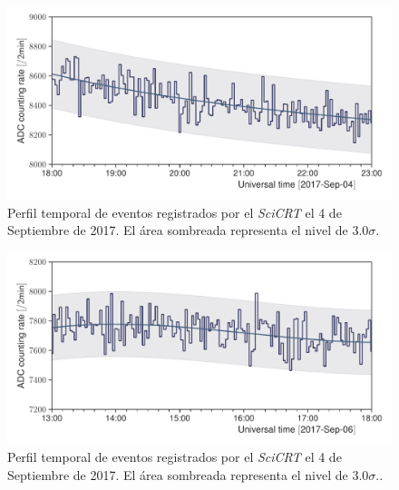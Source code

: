 \begin{figure}
        \centering
        \includegraphics[width=\textwidth]{neutron-170904.pdf}
        \caption{Perfil temporal de eventos registrados por el \emph{SciCRT} el \num{4} de Septiembre de \num{2017}. El área sombreada representa el nivel de $3.0\sigma$.}
        \label{fig:september-04}
\end{figure}

\begin{figure}
        \centering
        \includegraphics[width=\textwidth]{neutron-170906.pdf}
        \caption{Perfil temporal de eventos registrados por el \emph{SciCRT} el \num{4} de Septiembre de \num{2017}. El área sombreada representa el nivel de $3.0\sigma$..}
        \label{fig:september-06}
\end{figure}
